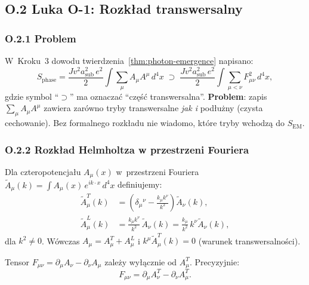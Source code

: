 \subsection*{O.2 Luka O-1: Rozkład transwersalny}
\label{ssec:transverse_decomp}

\subsubsection*{O.2.1 Problem}

W~Kroku~3 dowodu twierdzenia~\ref{thm:photon-emergence} napisano:
\begin{equation}
  S_\mathrm{phase}
  = \frac{Jv^2 a_\mathrm{sub}^2\,e^2}{2}
    \int\!\sum_\mu A_\mu A^\mu\,d^4x
  \;\supset\;
  \frac{Jv^2 a_\mathrm{sub}^2\,e^2}{2}
  \int\!\sum_{\mu<\nu}F_{\mu\nu}^2\,d^4x,
\end{equation}
gdzie symbol ``$\supset$'' ma oznaczać ``część transwersalna''.
\textbf{Problem}: zapis $\sum_\mu A_\mu A^\mu$ zawiera zarówno
tryby transwersalne \emph{jak i} podłużny (czysta cechowanie).
Bez formalnego rozkładu nie wiadomo, które tryby wchodzą do $S_\mathrm{EM}$.

\subsubsection*{O.2.2 Rozkład Helmholtza w przestrzeni Fouriera}

\begin{definicja}
\label{def:helmholtz}
Dla czteropotencjału $A_\mu(x)$ w~przestrzeni Fouriera
$\tilde{A}_\mu(k) = \int A_\mu(x)\,e^{ik\cdot x}\,d^4x$
definiujemy:
\begin{align}
  \tilde{A}_\mu^T(k)
  &= \left(\delta_\mu{}^\nu - \frac{k_\mu k^\nu}{k^2}\right)\tilde{A}_\nu(k),
  \label{eq:transverse_proj}\\
  \tilde{A}_\mu^L(k)
  &= \frac{k_\mu k^\nu}{k^2}\,\tilde{A}_\nu(k)
  = \frac{k_\mu}{k^2}\,k^\nu\tilde{A}_\nu(k),
  \label{eq:longitudinal_proj}
\end{align}
dla $k^2 \neq 0$. Wówczas $A_\mu = A_\mu^T + A_\mu^L$ i
$k^\mu\tilde{A}_\mu^T(k) = 0$ (warunek transwersalności).
\end{definicja}

\begin{lemma}
\label{lem:F_transverse}
Tensor $F_{\mu\nu} = \partial_\mu A_\nu - \partial_\nu A_\mu$
zależy wyłącznie od $A_\mu^T$. Precyzyjnie:
\begin{equation}
  F_{\mu\nu} = \partial_\mu A_\nu^T - \partial_\nu A_\mu^T.
  \label{eq:F_only_T}
\end{equation}
\end{lemma}

